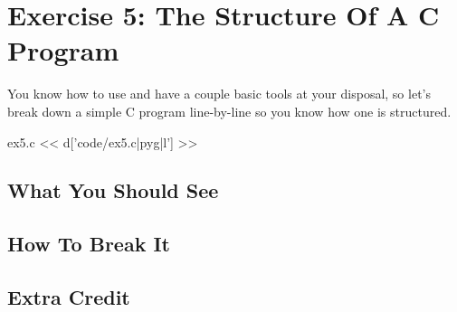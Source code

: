 \chapter{Exercise 5: The Structure Of A C Program}

You know how to use  and have a couple basic tools
at your disposal, so let's break down a simple C program line-by-line
so you know how one is structured.

\begin{code}{ex5.c}
<< d['code/ex5.c|pyg|l'] >>
\end{code}



\section{What You Should See}


\section{How To Break It}


\section{Extra Credit}



